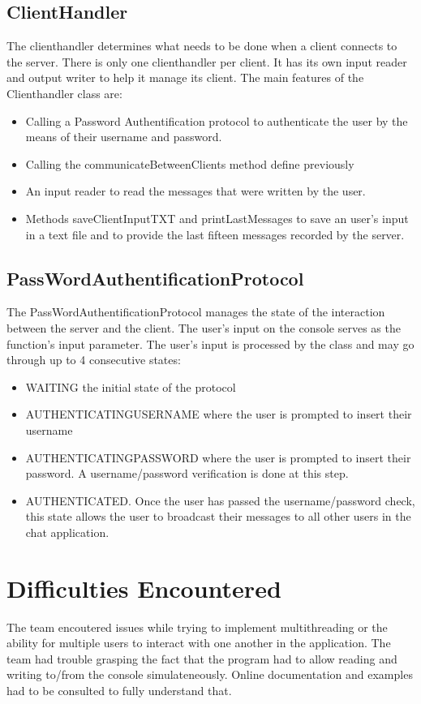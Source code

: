 \documentclass[11pt,letterpaper]{article}
\begin{document}
\subsection{ClientHandler}
The clienthandler determines what needs to be done when a client connects to the server. There is only one clienthandler per client. It has its own input reader and output writer to help it manage its client. The main features of the Clienthandler class are:
\begin{itemize}
  \item Calling a Password Authentification protocol to authenticate the user by the means of their username and password.
  \item Calling the communicateBetweenClients method define previously
  \item An input reader to read the messages that were written by the user.
  \item Methods saveClientInputTXT and printLastMessages to save an user's input in a text file and to provide the last fifteen messages recorded by the server.
\end{itemize}

\subsection{PassWordAuthentificationProtocol}
The PassWordAuthentificationProtocol manages the state of the interaction between the server and the client. The user's input on the console serves as the function's input parameter. The user's input is processed by the class and may go through up to 4 consecutive states:

\begin{itemize}
  \item WAITING the initial state of the protocol
  \item AUTHENTICATINGUSERNAME  where the user is prompted to insert their username
  \item AUTHENTICATINGPASSWORD where the user is prompted to insert their password. A username/password verification is done at this step. 
  \item AUTHENTICATED. Once the user has passed the username/password check, this state allows the user to broadcast their messages to all other users in the chat application.
\end{itemize}

\section{Difficulties Encountered}
The team encoutered issues while trying to implement multithreading or the ability for multiple users to interact with one another in the application. The team had trouble grasping the fact that the program had to allow reading and writing to/from the console simulateneously. Online documentation and examples had to be consulted to fully understand that. 
\end{document}
